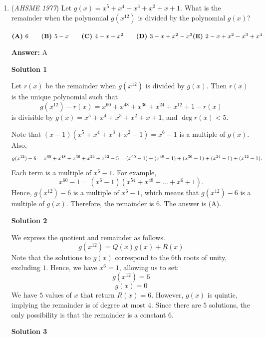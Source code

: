 \begin{enumerate}
 -j314andrews

 


	\item (\textit{AHSME 1977}) Let $g(x)=x^5+x^4+x^3+x^2+x+1$. What is the remainder when the polynomial $g(x^{12})$ is divided by the polynomial $g(x)$?


 $\textbf{(A) }6\qquad \textbf{(B) }5-x\qquad \textbf{(C) }4-x+x^2\qquad \textbf{(D) }3-x+x^2-x^3\qquad \\ \textbf{(E) }2-x+x^2-x^3+x^4$

 \textbf{Answer: }A



\textbf{Solution 1}

Let $r(x)$ be the remainder when $g(x^{12})$ is divided by $g(x)$. Then $r(x)$ is the unique polynomial such that
 \[g(x^{12}) - r(x) = x^{60} + x^{48} + x^{36} + x^{24} + x^{12} + 1 - r(x)\]is divisible by $g(x) = x^5 + x^4 + x^3 + x^2 + x + 1$, and $\deg r(x) < 5$.

 Note that $(x - 1)(x^5 + x^4 + x^3 + x^2 + 1) = x^6 - 1$ is a multiple of $g(x)$. Also,
 \[g(x^{12}) - 6 = x^{60} + x^{48} + x^{36} + x^{24} + x^{12} - 5 \\ = (x^{60} - 1) + (x^{48} - 1) + (x^{36} - 1) + (x^{24} - 1) + (x^{12} - 1).\]Each term is a multiple of $x^6 - 1$. For example,
 \[x^{60} - 1 = (x^6 - 1)(x^{54} + x^{48} + \dots + x^6 + 1).\]Hence, $g(x^{12}) - 6$ is a multiple of $x^6 - 1$, which means that $g(x^{12}) - 6$ is a multiple of $g(x)$. Therefore, the remainder is $\boxed{6}$. The answer is (A).

 



\textbf{Solution 2}

We express the quotient and remainder as follows.
 \[g(x^{12}) = Q(x) g(x) + R(x)\]Note that the solutions to $g(x)$ correspond to the 6th roots of unity, excluding $1$. Hence, we have $x^6 = 1$, allowing us to set:
 \[g(x^{12}) = 6\]
 \[g(x) = 0\]We have $5$ values of $x$ that return $R(x) = 6$. However, $g(x)$ is quintic, implying the remainder is of degree at most $4$. Since there are $5$ solutions, the only possibility is that the remainder is a constant $\boxed{6}$.

 



\textbf{Solution 3}


\end{enumerate}
